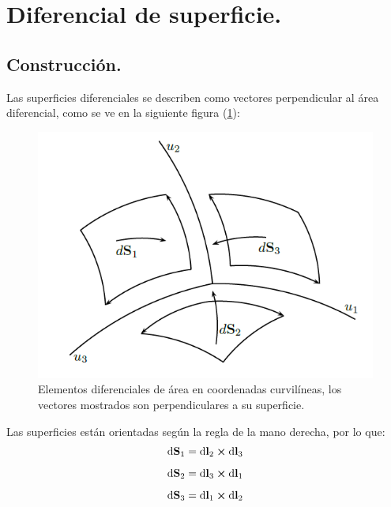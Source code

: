 \documentclass[12pt]{article}
\numberwithin{equation}{section}
\begin{document}
\section{Diferencial de superficie.}

\subsection{Construcción.}

Las superficies diferenciales se describen como vectores perpendicular al área diferencial, como se ve en la siguiente figura (\ref{fig:figura_diferenciales_superficie}):

\begin{figure}[h!]
    \centering
    \includegraphics[scale=0.75]{Imagenes/Diferenciales_Superficie_01.png}
    \caption{Elementos diferenciales de área en coordenadas curvilíneas, los vectores mostrados son perpendiculares a su superficie.}
    \label{fig:figura_diferenciales_superficie}
\end{figure}

Las superficies están orientadas según la regla de la mano derecha, por lo que:
\begin{align*}
\dd{\vb{S}_{1}} &= \dd{\vb{l}_{2}} \cp \dd{\vb{l}_{3}} \\[0.5em] 
\dd{\vb{S}_{2}} &= \dd{\vb{l}_{3}} \cp \dd{\vb{l}_{1}} \\[0.5em]
\dd{\vb{S}_{3}} &= \dd{\vb{l}_{1}} \cp \dd{\vb{l}_{2}}
\end{align*}
\end{document}
